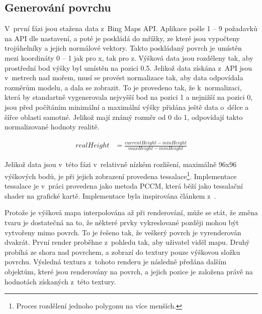 \subsection*{Generování povrchu} \label{impl-gen-surface}
V~první fázi jsou stažena data z~Bing Maps API. Aplikace pošle 1 -- 9 požadavků na API dle nastavení, a poté je poskládá do mřížky, ze které jsou vypočteny trojúhelníky a jejich normálové vektory. Takto poskládaný povrch je umístěn mezi koordináty 0 -- 1 jak pro x, tak pro z. Výšková data jsou rozděleny tak, aby prostřední bod výšky byl umístěn na pozici 0.5. Jelikož data získána z~API jsou v~metrech nad mořem, musí se provést normalizace tak, aby data odpovídala rozměrům modelu, a dala se zobrazit. To je provedeno tak, že k~normalizaci, která by standartně vygenerovala nejvyšší bod na pozici 1 a nejnižší na pozici 0, jsou před počítáním minimální a maximální výšky přidána ještě data o~délce a šířce oblasti samotné. Jelikož mají známý rozměr od 0 do 1, odpovídají takto normalizované hodnoty realitě.

\begin{align}
 realHeight &= \frac{currentHeight - minHeight}{maxHeight - minHeight} \nonumber
\end{align}

Jelikož data jsou v~této fázi v~relativně nízkém rozlišení, maximálně 96x96 výškových bodů, je při jejich zobrazení provedena tessalace\footnote{Proces rozdělení jednoho polygonu na více menších.}. Implementace tessalace je v~práci provedena jako metoda PCCM, která běží jako tessalační shader na grafické kartě. Implementace byla inspirována článkem z~\cite{ogldev}.

Protože je výšková mapa interpolována až při renderování, může se stát, že změna tvaru je dostatečná na to, že některé prvky vykreslované později mohou být vytvořeny mimo povrch. To je řešeno tak, že veškerý povrch je vyrenderován dvakrát. První render proběhne z~pohledu tak, aby uživatel viděl mapu. Druhý probíhá ze shora nad povrchem, a zobrazí do textury pouze výškovou složku povrchu. Výsledná textura z~tohoto renderu je následně předána dalším objektům, které jsou renderovány na povrch, a jejich pozice je založena právě na hodnotách získaných z~této textury.

